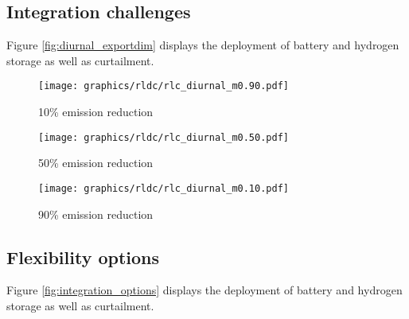 \subsection{Integration challenges}


Figure \ref{fig:diurnal_exportdim} displays the deployment of battery and hydrogen storage as well as curtailment.

\begin{figure*}[t] %
    \centering
    \begin{subfigure}[b]{0.3\linewidth}
        \centering
        \texttt{[image: graphics/rldc/rlc\_diurnal\_m0.90.pdf]}
        \caption{10\% emission reduction}
        \label{fig:diurnal_10emred}
    \end{subfigure}
    \hfill
    \begin{subfigure}[b]{0.3\linewidth}
        \centering
        \texttt{[image: graphics/rldc/rlc\_diurnal\_m0.50.pdf]}
        \caption{50\% emission reduction}
        \label{fig:diurnal_50emred}
    \end{subfigure}
    \hfill
    \begin{subfigure}[b]{0.3\linewidth}
        \centering
        \texttt{[image: graphics/rldc/rlc\_diurnal\_m0.10.pdf]}
        \caption{90\% emission reduction}
        \label{fig:diurnal_90emred}
    \end{subfigure}
    \hfill
    \caption{Export dependent (0 - 200 TWh) residual load curves with various integration options. Each row represents different integration strategies (RLC without integration, RLC with curtailment, RLC with curtailment and electrolyzer load).
    Each column represents different climate ambitions (10 - 90\% emission reduction)}
    \label{fig:diurnal_exportdim}
\end{figure*}













\subsection{Flexibility options}
Figure \ref{fig:integration_options} displays the deployment of battery and hydrogen storage as well as curtailment.

